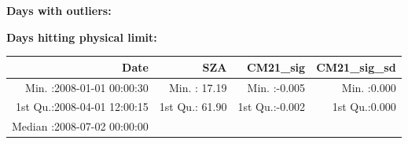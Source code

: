 \documentclass[
  10pt,
  a4paper,oneside]{article}
\begin{document}
\normalsize

\textbf{Days with outliers:}

\textbf{Days hitting physical limit:}

\footnotesize

\begin{longtable}[]{@{}rrrr@{}}
\toprule
\begin{minipage}[b]{0.33\columnwidth}\raggedleft
Date\strut
\end{minipage} & \begin{minipage}[b]{0.19\columnwidth}\raggedleft
SZA\strut
\end{minipage} & \begin{minipage}[b]{0.19\columnwidth}\raggedleft
CM21\_sig\strut
\end{minipage} & \begin{minipage}[b]{0.19\columnwidth}\raggedleft
CM21\_sig\_sd\strut
\end{minipage}\tabularnewline
\midrule
\endhead
\begin{minipage}[t]{0.33\columnwidth}\raggedleft
Min. :2008-01-01 00:00:30\strut
\end{minipage} & \begin{minipage}[t]{0.19\columnwidth}\raggedleft
Min. : 17.19\strut
\end{minipage} & \begin{minipage}[t]{0.19\columnwidth}\raggedleft
Min. :-0.005\strut
\end{minipage} & \begin{minipage}[t]{0.19\columnwidth}\raggedleft
Min. :0.000\strut
\end{minipage}\tabularnewline
\begin{minipage}[t]{0.33\columnwidth}\raggedleft
1st Qu.:2008-04-01 12:00:15\strut
\end{minipage} & \begin{minipage}[t]{0.19\columnwidth}\raggedleft
1st Qu.: 61.90\strut
\end{minipage} & \begin{minipage}[t]{0.19\columnwidth}\raggedleft
1st Qu.:-0.002\strut
\end{minipage} & \begin{minipage}[t]{0.19\columnwidth}\raggedleft
1st Qu.:0.000\strut
\end{minipage}\tabularnewline
\begin{minipage}[t]{0.33\columnwidth}\raggedleft
Median :2008-07-02 00:00:00\strut
\end{minipage} & \begin{minipage}[t]{0.19\columnwidth}\raggedleft

\end{minipage}
\end{longtable}
\end{document}
